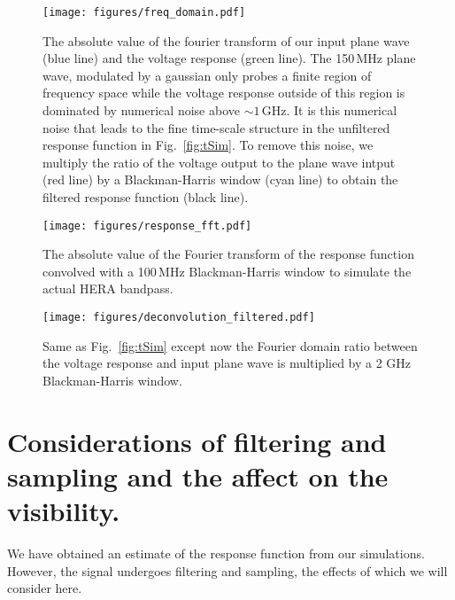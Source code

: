 \documentclass[useAMS,usenatbib]{mn2e}
\begin{document}
\begin{figure*}
\texttt{[image: figures/freq\_domain.pdf]}
\caption{The absolute value of the fourier transform of our input plane wave (blue line) and the voltage response (green line). The 150\,MHz plane wave, modulated by a gaussian only probes a finite region of frequency space while the voltage response outside of this region is dominated by numerical noise above $\sim 1$\,GHz. It is this numerical noise that leads to the fine time-scale structure in the unfiltered response function in Fig.~\ref{fig:tSim}. To remove this noise, we multiply the ratio of the voltage output to the plane wave intput (red line) by a Blackman-Harris window (cyan line) to obtain the filtered response function (black line).}
\label{fig:freqDomain}
\end{figure*}




\begin{figure}
\texttt{[image: figures/response\_fft.pdf]}
\caption{The absolute value of the Fourier transform of the response function convolved with a 100\,MHz Blackman-Harris window to simulate the actual HERA bandpass.}
\label{fig:finalFilter}
\end{figure}

\begin{figure*}
\texttt{[image: figures/deconvolution\_filtered.pdf]}
\caption{Same as Fig.~\ref{fig:tSim} except now the Fourier domain ratio between the voltage response and input plane wave is multiplied by a 2 GHz Blackman-Harris window. }
\label{fig:tSimFiltered}
\end{figure*}

\section{Considerations of filtering and sampling and the affect on the visibility.}
We have obtained an estimate of the response function from our simulations. However, the signal undergoes filtering and sampling, the effects of which we will consider here. 
\end{document}
